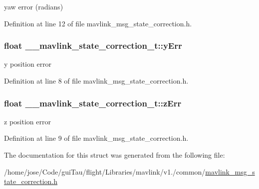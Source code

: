 yaw error (radians) 



Definition at line 12 of file mavlink\-\_\-msg\-\_\-state\-\_\-correction.\-h.

\hypertarget{struct____mavlink__state__correction__t_aa01cccfabecbeeff9b5c960807888bfb}{
\subsubsection[{y\-Err}]{\setlength{\rightskip}{0pt plus 5cm}float \-\_\-\-\_\-mavlink\-\_\-state\-\_\-correction\-\_\-t\-::y\-Err}}\label{struct____mavlink__state__correction__t_aa01cccfabecbeeff9b5c960807888bfb}


y position error 



Definition at line 8 of file mavlink\-\_\-msg\-\_\-state\-\_\-correction.\-h.

\hypertarget{struct____mavlink__state__correction__t_aafffced7328528370e9c1393be21f3e2}{
\subsubsection[{z\-Err}]{\setlength{\rightskip}{0pt plus 5cm}float \-\_\-\-\_\-mavlink\-\_\-state\-\_\-correction\-\_\-t\-::z\-Err}}\label{struct____mavlink__state__correction__t_aafffced7328528370e9c1393be21f3e2}


z position error 



Definition at line 9 of file mavlink\-\_\-msg\-\_\-state\-\_\-correction.\-h.



The documentation for this struct was generated from the following file\-:\begin{DoxyCompactItemize}
\item 
/home/jose/\-Code/gui\-Tau/flight/\-Libraries/mavlink/v1./common/\hyperlink{mavlink__msg__state__correction_8h}{mavlink\-\_\-msg\-\_\-state\-\_\-correction.\-h}\end{DoxyCompactItemize}
